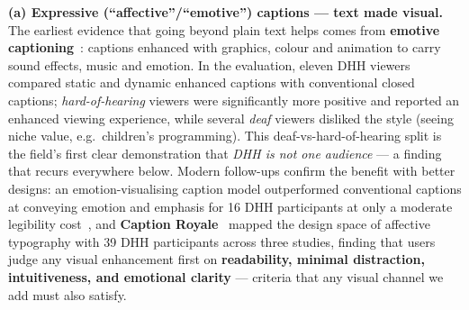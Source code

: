 \documentclass[11pt,a4paper]{article}
\begin{document}
\medskip\noindent\textbf{(a) Expressive (``affective''/``emotive'') captions --- text made visual.}
The earliest evidence that going beyond plain text helps comes from \textbf{emotive
captioning}~\cite{emotivecaptions}: captions enhanced with graphics, colour and animation to carry
sound effects, music and emotion. In the evaluation, eleven DHH viewers compared static and dynamic
enhanced captions with conventional closed captions; \emph{hard-of-hearing} viewers were
significantly more positive and reported an enhanced viewing experience, while several \emph{deaf}
viewers disliked the style (seeing niche value, e.g.\ children's programming). This
deaf-vs-hard-of-hearing split is the field's first clear demonstration that \emph{DHH is not one
audience} --- a finding that recurs everywhere below. Modern follow-ups confirm the benefit with
better designs: an emotion-visualising caption model outperformed conventional captions at conveying
emotion and emphasis for 16 DHH participants at only a moderate legibility cost~\cite{prosodycaptions},
and \textbf{Caption Royale}~\cite{captionroyale} mapped the design space of affective typography with
39 DHH participants across three studies, finding that users judge any visual enhancement first on
\textbf{readability, minimal distraction, intuitiveness, and emotional clarity} --- criteria that any
visual channel we add must also satisfy.
\end{document}
